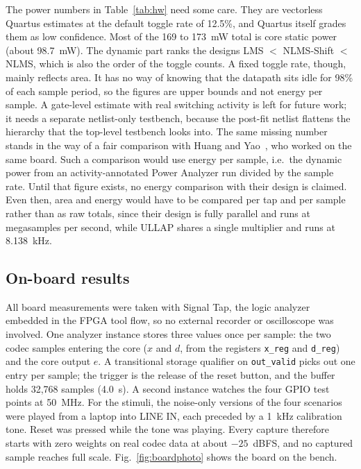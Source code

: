 The power numbers in Table~\ref{tab:hw} need some care. They are vectorless Quartus estimates at the
default toggle rate of 12.5\%, and Quartus itself grades them as low confidence. Most of the 169 to
173~mW total is core static power (about 98.7~mW). The dynamic part ranks the designs LMS $<$ NLMS-Shift
$<$ NLMS, which is also the order of the toggle counts. A fixed toggle rate, though, mainly reflects area.
It has no way of knowing that the datapath sits idle for 98\% of each sample period, so the figures are
upper bounds and not energy per sample. A gate-level estimate with real switching activity is left for
future work; it needs a separate netlist-only testbench, because the post-fit netlist flattens the
hierarchy that the top-level testbench looks into. The same missing number stands in the way of a fair
comparison with Huang and Yao~\cite{huang2026}, who worked on the same board. Such a comparison would use
energy per sample, i.e.\ the dynamic power from an activity-annotated Power Analyzer run divided by the
sample rate. Until that figure exists, no energy comparison with their design is claimed. Even then, area
and energy would have to be compared per tap and per sample rather than as raw totals, since their design
is fully parallel and runs at megasamples per second, while ULLAP shares a single multiplier and runs at
8.138~kHz.



\subsection{On-board results}\label{sec:board}
All board measurements were taken with Signal Tap, the logic analyzer embedded in the FPGA tool flow, so
no external recorder or oscilloscope was involved. One analyzer instance stores three values once per
sample: the two codec samples entering the core ($x$ and $d$, from the registers \texttt{x\_reg} and
\texttt{d\_reg}) and the core output $e$. A transitional storage qualifier on \texttt{out\_valid} picks out
one entry per sample; the trigger is the release of the reset button, and the buffer holds 32,768 samples
(4.0~s). A second instance watches the four GPIO test points at 50~MHz. For the stimuli, the noise-only
versions of the four scenarios were played from a laptop into LINE IN, each preceded by a 1~kHz
calibration tone. Reset was pressed while the tone was playing. Every capture therefore starts with zero
weights on real codec data at about $-25$~dBFS, and no captured sample reaches full scale. Fig.~\ref{fig:boardphoto} shows the board on the bench.

